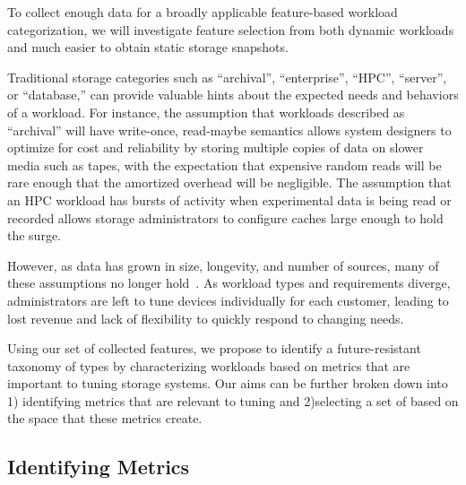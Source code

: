 
To collect enough data for a broadly applicable feature-based workload
categorization, we will investigate feature selection from both dynamic
workloads and much easier to obtain static storage snapshots.

Traditional storage categories such as 
``archival'', ``enterprise'', ``HPC'', ``server'', or ``database,'' can provide
valuable hints about the expected needs and behaviors of a workload.  For
instance, the assumption that workloads described as ``archival'' will have
write-once, read-maybe semantics allows system designers to optimize for cost
and reliability by storing multiple copies of data on slower media such as
tapes, with the expectation that expensive random reads will be rare enough that
the amortized overhead will be negligible.  The assumption that an HPC workload
has bursts of activity when experimental data is being read or recorded allows
storage administrators to configure caches large enough to hold the surge.

However, as data has grown in size, longevity, and number of sources, many of
these assumptions no longer hold~\cite{ian-tos,dwyer2012practical}.  As workload types and
requirements diverge, administrators are left to tune devices individually for
each customer, leading to lost revenue and lack of flexibility to quickly
respond to changing needs.  

Using our set of collected features, we propose to identify a future-resistant taxonomy
of \mW types by characterizing workloads based on metrics that are
important to tuning storage systems.  Our aims can be further broken down
into 1) identifying metrics that are relevant to tuning and 2)selecting a set of
\mws based on the space that these metrics create. 

\subsection{Identifying Metrics}


